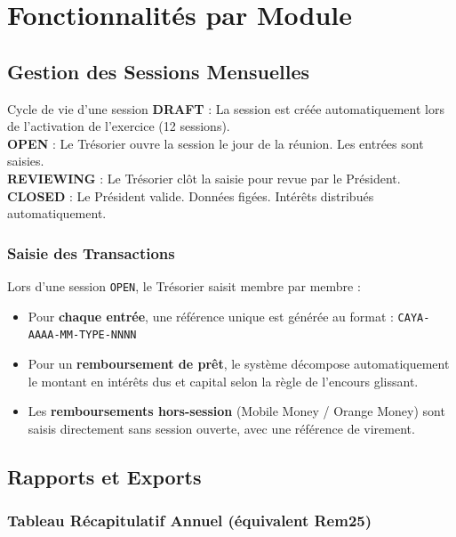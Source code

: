 \documentclass[12pt, a4paper]{report}
\begin{document}
\chapter{Fonctionnalités par Module}

\section{Gestion des Sessions Mensuelles}

\begin{ruleBox}{Cycle de vie d'une session}
\textbf{DRAFT} : La session est créée automatiquement lors de l'activation de l'exercice (12 sessions).\\
\textbf{OPEN} : Le Trésorier ouvre la session le jour de la réunion. Les entrées sont saisies.\\
\textbf{REVIEWING} : Le Trésorier clôt la saisie pour revue par le Président.\\
\textbf{CLOSED} : Le Président valide. Données figées. Intérêts distribués automatiquement.
\end{ruleBox}

\subsection{Saisie des Transactions}

Lors d'une session \texttt{OPEN}, le Trésorier saisit membre par membre :
\begin{itemize}
  \item Pour \textbf{chaque entrée}, une référence unique est générée au format :
        \texttt{CAYA-AAAA-MM-TYPE-NNNN}
  \item Pour un \textbf{remboursement de prêt}, le système décompose automatiquement le montant
        en intérêts dus et capital selon la règle de l'encours glissant.
  \item Les \textbf{remboursements hors-session} (Mobile Money / Orange Money) sont saisis
        directement sans session ouverte, avec une référence de virement.
\end{itemize}

\section{Rapports et Exports}

\subsection{Tableau Récapitulatif Annuel (équivalent Rem25)}
\end{document}

